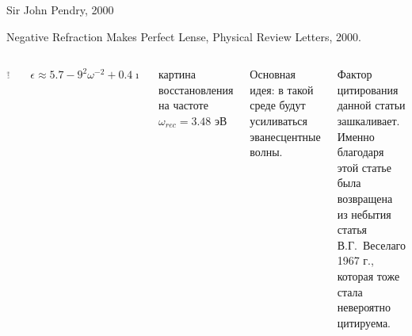 \documentclass[9pt, compress, xcolor=table]{beamer}
\begin{document}
\begin{frame}{Sir John Pendry, 2000}

Negative Refraction Makes Perfect Lense, Physical Review Letters, 2000.

\begin{columns}[c]
\column{6cm}
\begin{center}
\includegraphics[width=0.5\textwidth]{neg_ref_13}
\end{center}
{\scriptsize $\epsilon \approx 5.7 - 9^2 \omega^{-2} +0.4 \imath$

картина восстановления на частоте $\omega_{rec} = 3.48$ эВ}
\column{6cm}



\textcolor{red!50!black}{Основная идея}: в такой среде будут усиливаться эванесцентные волны.

Фактор цитирования данной статьи зашкаливает. Именно благодаря этой статье была возвращена из небытия статья В.Г.~Веселаго 1967 г., которая тоже стала невероятно цитируема. 


\end{columns}
\end{frame}
\end{document}
